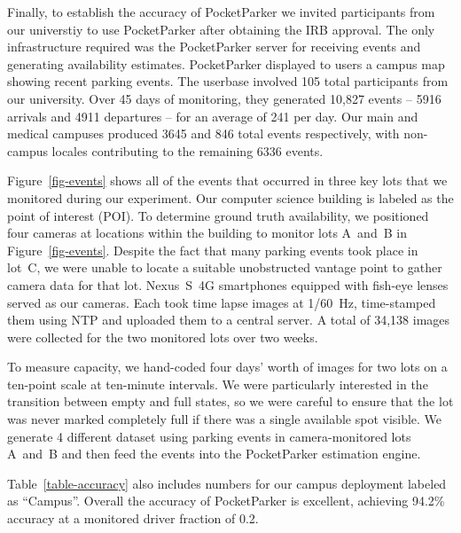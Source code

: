 Finally, to establish the accuracy of PocketParker we invited participants from
our universtiy to use PocketParker after obtaining the IRB approval.
The only infrastructure required was the PocketParker server for
receiving events and generating availability estimates.  PocketParker displayed
to users a campus map showing recent parking events.
The userbase involved 105 total participants from our university.  Over 45 days of 
monitoring, they generated 10,827 events -- 5916 arrivals and 4911 
departures -- for an average of 241 per day.  Our main and medical 
campuses produced 3645 and 846 total events respectively, with non-campus 
locales contributing to the remaining 6336 events.

Figure~\ref{fig-events} shows all of the events that occurred in three key
lots that we monitored during our experiment. Our computer science
building is labeled as the point of interest (POI). To determine ground
truth availability, we positioned four cameras at locations within the
building to monitor lots A~and~B in Figure~\ref{fig-events}.  Despite the fact
that many parking events took place in lot~C, we were unable to locate a
suitable unobstructed vantage point to gather camera data for that lot.
Nexus~S~4G smartphones equipped with fish-eye lenses served as our cameras.
Each took time lapse images at 1/60~Hz, time-stamped them using NTP and uploaded
them to a central server. A total of 34,138 images were collected for the two 
monitored lots over two weeks.

To measure capacity, we hand-coded four days' worth of images for two lots on
a ten-point scale at ten-minute intervals. We were particularly interested
in the transition between empty and full states, so we were careful to ensure
that the lot was never marked completely full if there was a single available
spot visible. We generate 4 different dataset using parking events in 
camera-monitored lots A~and~B and then feed the events into the PocketParker
estimation engine.

Table~\ref{table-accuracy} also includes numbers for our campus deployment
labeled as ``Campus''. Overall the accuracy of PocketParker is excellent, 
achieving 94.2\% accuracy at a monitored driver fraction of 0.2. 
